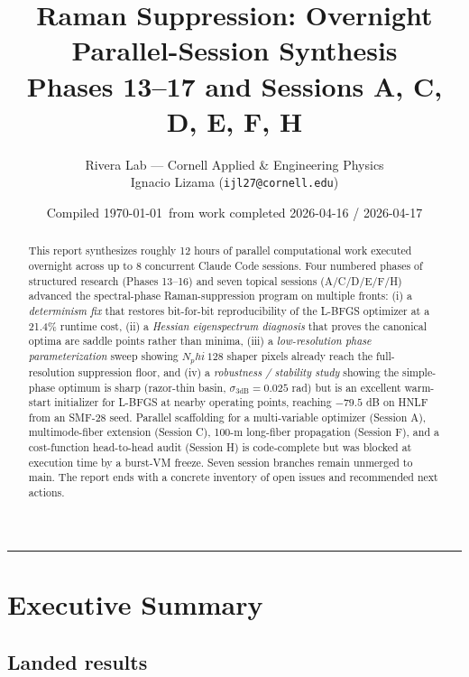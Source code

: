 \documentclass[11pt,letterpaper]{article}
\title{\bfseries Raman Suppression: Overnight Parallel-Session Synthesis\\
       \large Phases 13--17 and Sessions A, C, D, E, F, H}
\author{Rivera Lab --- Cornell Applied \& Engineering Physics\\
        {\small Ignacio Lizama (\texttt{ijl27@cornell.edu})}}
\date{Compiled \today~from work completed 2026-04-16 / 2026-04-17}
\def\varphi{phi}%
\def\mathrm#1{#1}%
\def\approx{~}%
\def\texttt#1{#1}%
\begin{document}
\maketitle
\thispagestyle{fancy}

\begin{abstract}
\noindent
This report synthesizes roughly 12 hours of parallel computational work executed overnight across up to 8 concurrent Claude Code sessions. Four numbered phases of structured research (Phases 13--16) and seven topical sessions (A/C/D/E/F/H) advanced the spectral-phase Raman-suppression program on multiple fronts:
(i) a \emph{determinism fix} that restores bit-for-bit reproducibility of the L-BFGS optimizer at a 21.4\% runtime cost,
(ii) a \emph{Hessian eigenspectrum diagnosis} that proves the canonical optima are saddle points rather than minima,
(iii) a \emph{low-resolution phase parameterization} sweep showing $\mathrm{N}_\varphi \approx 128$ shaper pixels already reach the full-resolution suppression floor, and
(iv) a \emph{robustness / stability study} showing the simple-phase optimum is sharp (razor-thin basin, $\sigma_{3\text{dB}} = 0.025$ rad) but is an excellent warm-start initializer for L-BFGS at nearby operating points, reaching $-79.5$ dB on HNLF from an SMF-28 seed.
Parallel scaffolding for a multi-variable optimizer (Session A), multimode-fiber extension (Session C), 100-m long-fiber propagation (Session F), and a cost-function head-to-head audit (Session H) is code-complete but was blocked at execution time by a burst-VM freeze. Seven session branches remain unmerged to \texttt{main}. The report ends with a concrete inventory of open issues and recommended next actions.
\end{abstract}

\tableofcontents
\vspace{1em}
\hrule

\section{Executive Summary}

\subsection{Landed results}
\end{document}
